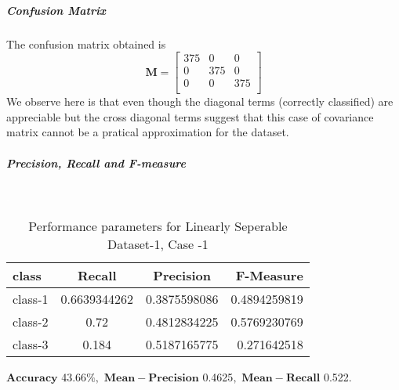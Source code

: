 \documentclass[a4paper]{article}
\begin{document}
\subparagraph{Confusion Matrix}
The confusion matrix obtained is
\[
\mathbf{M} = \left[ {\begin{array}{ccc}
375 & 0 & 0\\
0 & 375 & 0\\
0 & 0 & 375\\
\end{array}} \right]
\]We observe here is that even though the diagonal terms (correctly classified) are appreciable but the cross diagonal terms suggest that this case of covariance matrix cannot be a pratical approximation for the dataset.
\subparagraph{Precision, Recall and F-measure} \textcolor{white}{:}
\begin{table}[H]
  \begin{center}
    \caption{Performance parameters for Linearly Seperable Dataset-1, Case -1}
    \label{tab:table1}
    \begin{tabular}{l|c|c|r} %
      \textbf{class} & \textbf{Recall} & \textbf{Precision} & \textbf{F-Measure}\\
      \hline
      class-1 & 0.6639344262 & 0.3875598086 & 0.4894259819\\
      class-2 & 0.72 & 0.4812834225 & 0.5769230769\\
      class-3 & 0.184 & 0.5187165775 & 0.271642518\\
    \end{tabular}
  \end{center}
\end{table}
$\mathbf{Accuracy}$ 43.66$ \%,$ $\mathbf{Mean- Precision}$ 0.4625$ ,$ $\mathbf{Mean- Recall}$ 0.522$.$
\end{document}
